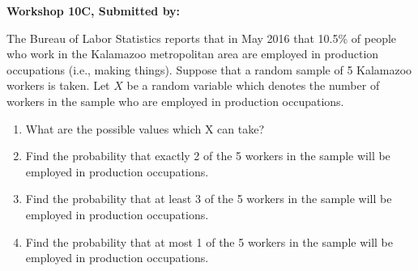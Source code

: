 \documentclass[11pt]{book}\usepackage[]{graphicx}\usepackage[]{color}
\begin{document}
\begin{exercises}
\begin{exercise}
\end{exercise}
\begin{solution}  %

\end{solution}


\clearpage

   \begin{exercise}  %

    \begin{center}
\begin{flushleft}\textbf{\large \hfill Workshop 10C, Submitted by: }\end{flushleft}

\end{center}

The Bureau of Labor Statistics reports that in May 2016 that 10.5\% of people who work in the Kalamazoo metropolitan area are employed in production occupations (i.e., making things). Suppose that a random sample of 5 Kalamazoo workers is taken. Let $X$ be a random variable which denotes the number of workers in the sample who are employed in production occupations.

\begin{enumerate}
\item What are the possible values which X can take?
\item Find the probability that exactly 2 of the 5 workers in the sample will be employed in production occupations.
\item Find the probability that at least 3 of the 5 workers in the sample will be employed in production occupations.
\item Find the probability that at most 1 of the 5 workers in the sample will be employed in production occupations.
\end{enumerate}


\end{exercise}
\end{exercises}
\end{document}
